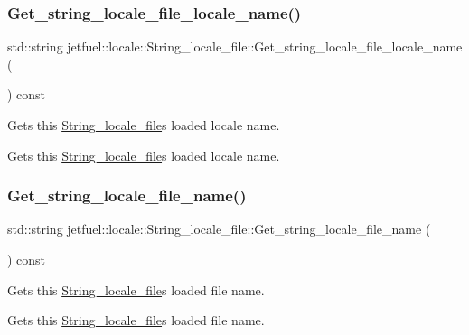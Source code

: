\subsubsection{\texorpdfstring{Get\+\_\+string\+\_\+locale\+\_\+file\+\_\+locale\+\_\+name()}{Get\_string\_locale\_file\_locale\_name()}}
{\footnotesize\ttfamily std\+::string jetfuel\+::locale\+::\+String\+\_\+locale\+\_\+file\+::\+Get\+\_\+string\+\_\+locale\+\_\+file\+\_\+locale\+\_\+name (\begin{DoxyParamCaption}{ }\end{DoxyParamCaption}) const\hspace{0.3cm}{\ttfamily [inline]}}



Gets this \hyperlink{classjetfuel_1_1locale_1_1String__locale__file}{String\+\_\+locale\+\_\+file}\textquotesingle{}s loaded locale name. 

Gets this \hyperlink{classjetfuel_1_1locale_1_1String__locale__file}{String\+\_\+locale\+\_\+file}\textquotesingle{}s loaded locale name. \mbox{\label{classjetfuel_1_1locale_1_1String__locale__file_a5f632b2d522da339f8a21e1bf808339e}} 
\subsubsection{\texorpdfstring{Get\+\_\+string\+\_\+locale\+\_\+file\+\_\+name()}{Get\_string\_locale\_file\_name()}}
{\footnotesize\ttfamily std\+::string jetfuel\+::locale\+::\+String\+\_\+locale\+\_\+file\+::\+Get\+\_\+string\+\_\+locale\+\_\+file\+\_\+name (\begin{DoxyParamCaption}{ }\end{DoxyParamCaption}) const\hspace{0.3cm}{\ttfamily [inline]}}



Gets this \hyperlink{classjetfuel_1_1locale_1_1String__locale__file}{String\+\_\+locale\+\_\+file}\textquotesingle{}s loaded file name. 

Gets this \hyperlink{classjetfuel_1_1locale_1_1String__locale__file}{String\+\_\+locale\+\_\+file}\textquotesingle{}s loaded file name. \mbox{\label{classjetfuel_1_1locale_1_1String__locale__file_a66f25007449bac68d94e0cea2c13b313}} 
